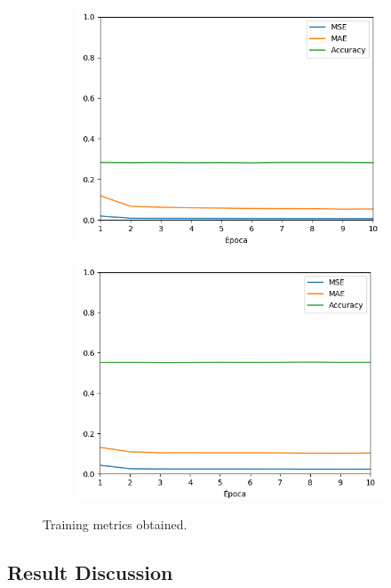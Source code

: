 \documentclass{cys}
\begin{document}
\begin{figure}[h]
\begin{subfigure}{0.32\textwidth}
		\includegraphics[width=\textwidth]{img/chauffeur3m}
		\label{subfig:5}
	\end{subfigure}
	\begin{subfigure}{0.32\textwidth} 
		\includegraphics[width=\textwidth]{img/chauffeur5m}
		\label{subfig:6}
	\end{subfigure}
	\caption{Training metrics obtained.} 
	\label{fig:pilottest}
\end{figure}


\subsection{Result Discussion}
\end{document}
